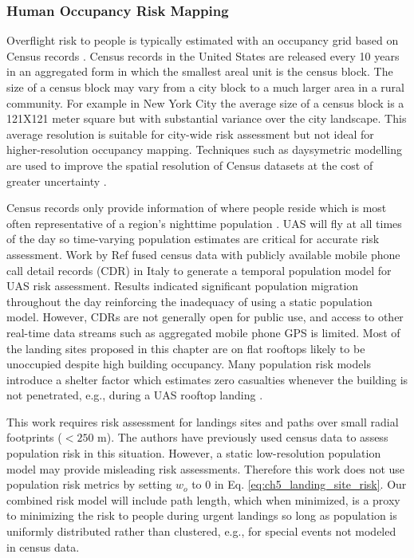 \subsubsection{Human Occupancy Risk Mapping}\label{sec:ch5_occupancy_cost}

Overflight risk to people is typically estimated with an occupancy grid based on Census records \cite{stevenson_estimated_2015-1, ten_harmsel_emergency_2017, ancel_real-time_2017}.  Census records in the United States are released every 10 years in an aggregated form in which the smallest areal unit is the census block. The size of a census block may vary from a city block to a much larger area in a rural community. For example in New York City the average size of a census block is a 121X121 meter square but with substantial variance over the city landscape.  This average resolution is suitable for city-wide risk assessment but not ideal for higher-resolution occupancy mapping. Techniques such as daysymetric modelling \cite{nagle_dasymetric_2014-1} are used to improve the spatial resolution of Census datasets at the cost of greater uncertainty \cite{dmowska_high_2017-1}.

Census records only provide information of where people reside which is most often representative of a region's nighttime population \cite{di_donato_evaluating_2017}.  \ac{UAS} will fly at all times of the day so time-varying population estimates are critical for accurate risk assessment. Work by Ref \cite{di_donato_evaluating_2017} fused census data with  publicly available mobile phone call detail records (CDR) in Italy to generate a temporal population model for \ac{UAS} risk assessment. Results indicated significant population migration throughout the day reinforcing the inadequacy of using a static population model. However, CDRs are not generally open for public use, and access to other real-time data streams such as aggregated mobile phone GPS is limited. Most of the landing sites proposed in this chapter are on flat rooftops likely to be unoccupied despite high building occupancy. Many population risk models introduce a shelter factor which estimates zero casualties whenever the building is not penetrated, e.g., during a \ac{UAS} rooftop landing \cite{melnyk_third-party_2014-1}.

This work requires risk assessment for landings sites and paths over small radial footprints ($<250$ m). The authors have previously used census data to assess population risk in this situation. However, a static low-resolution population model may provide misleading risk assessments. Therefore this work does not use population risk metrics by setting $w_o$ to 0 in Eq. \ref{eq:ch5_landing_site_risk}. Our combined risk model will include path length, which when minimized, is a proxy to minimizing the risk to people during urgent landings so long as population is uniformly distributed rather than clustered, e.g., for special events not modeled in census data.

